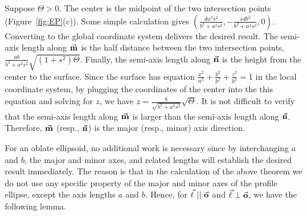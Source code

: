      Suppose $\Theta>0$.  The center is the midpoint of the two intersection
points (Figure~\ref{fig:EP}(c)).  Some simple calculation gives 
$\left(\frac{da^2s^2}{b^2+a^2s^2},-\frac{sdb^2}{b^2+a^2s^2},0\right)$.  
Converting to the global coordinate system delivers the desired result.  
The semi-axis length along $\vec{\bf m}$ is the half distance between the two 
intersection points,  $\frac{ab}{b^2+a^2s^2}\sqrt{(1+s^2)\Theta}$.  
Finally, the semi-axis length along $\vec{\bf n}$ is the height from the center 
to the surface.  Since the surface has equation 
$\frac{x^2}{a^2}+\frac{y^2}{b^2}+\frac{z^2}{b^2}=1$ in the local
coordinate system, by plugging the coordinates of the center into the this
equation and solving for $z$, we have 
$z=\frac{b}{\sqrt{b^2+a^2s^2}}\sqrt{\Theta}$. It is not difficult to verify
that the semi-axis length along $\vec{\bf m}$ is larger than the semi-axis
length along $\vec{\bf n}$.  Therefore, $\vec{\bf m}$ (resp., $\vec{\bf n}$) is
the major (resp., minor) axis direction.  \QED

     For an oblate ellipsoid, no additional work is necessary since by 
interchanging $a$ and $b$, the major and minor axes, and related lengths
will establish  the desired result immediately.  The reason
is that in the calculation of the above theorem we do not use any specific
property of the major and minor axes of the profile ellipse, except
the axis lengths $a$ and $b$.  Hence, for $\arrow{\ell}\ ||\ \arrow{o}$ and
$\vec{\bf \ell}\perp\vec{\bf o}$, we have the following lemma.


